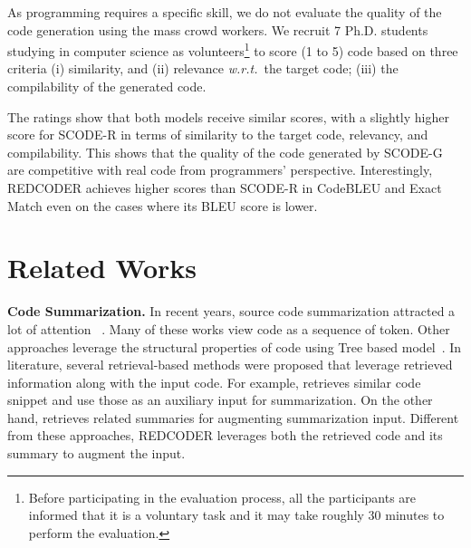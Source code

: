 \documentclass[11pt]{article}
\newcommand{\tool}{{REDCODER}\xspace}
\newcommand{\coder}{SCODE-R\xspace}
\newcommand{\wrt}{\textit{w.r.t.}~}
\begin{document}
As programming requires a specific skill, we do not evaluate the quality of the code generation using the mass crowd workers.
We recruit 7 Ph.D. students studying in computer science as volunteers\footnote{Before participating in the evaluation process, all the participants are informed that it is a voluntary task and it may take roughly 30 minutes to perform the evaluation.} to score (1 to 5) code based on three criteria (i) similarity, and (ii) relevance \wrt the target code; (iii) the compilability of the generated code.

The ratings show that both models receive similar scores, with a slightly higher score for \coder in terms of similarity to the target code, relevancy, and compilability. This shows that the quality of the code generated by SCODE-G are competitive with real code from programmers' perspective. Interestingly, \tool achieves higher scores than \coder in 
 CodeBLEU and Exact Match even on the cases where its BLEU score is lower. 
 




\begin{comment}
\smallskip\noindent\textbf{Intuition on our effectiveness\hspace{0.5em}}
A barrier in code generation is the diversity of identifiers.
A set of relevant candidates may therefore provide auxiliary supervision to the generator. Besides, the model may learn additional input-output mappings from retrieved code and their paired summary which can be viewed as augmented training instances.
\end{comment}

 \section{Related Works}

\noindent\textbf{Code Summarization.} In recent years, source code summarization attracted a lot of attention 
~\cite{iyer2016summarizing, liang2018automatic,allamanis2016convolutional,hu2018summarizing,ahmad-etal-2020-transformer}. Many of these works view code as a sequence of token.
Other approaches leverage the structural properties of code using Tree based model~\cite{shido2019automatic, harer2019tree, hu2018deep, leclair2019subroutines}.
In literature, several retrieval-based methods were proposed that leverage retrieved information along with the input code. 
For example, \citet{zhang2020retrieval} retrieves similar code snippet and use those as an auxiliary input for summarization. 
On the other hand,  \citet{hayati-etal-2018-retrieval} retrieves related summaries for augmenting summarization input. Different from these approaches, \tool leverages both the retrieved code and its summary to augment the input. 
\end{document}
